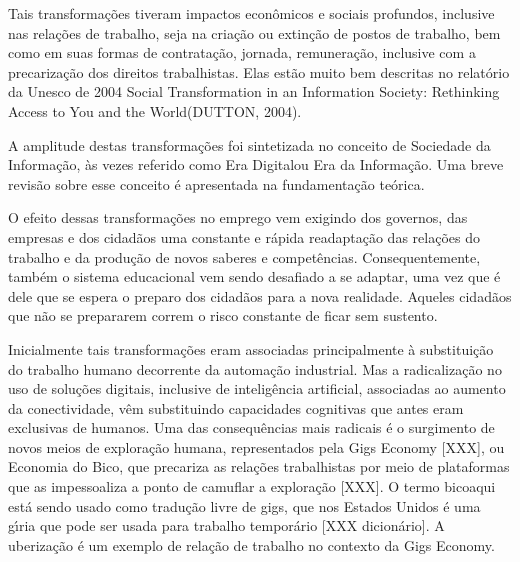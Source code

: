 \documentclass[
12pt,		%
openright,	%
twoside,  %
a4paper,			%
chapter=TITLE,		%
english,			%
french,				%
spanish,			%
brazil				%
]{USPSC-classe/USPSC}
\begin{document}
Tais transforma\c{c}\~oes tiveram impactos econ\^omicos e sociais profundos, inclusive nas rela\c{c}\~oes de trabalho, seja na cria\c{c}\~ao ou extin\c{c}\~ao de postos de trabalho, bem como em suas formas de contrata\c{c}\~ao, jornada, remunera\c{c}\~ao, inclusive com a precariza\c{c}\~ao dos direitos trabalhistas. Elas est\~ao muito bem descritas  no relat\'orio da Unesco  de 2004 \textquotedbl Social Transformation in an Information Society: Rethinking Access to You and the World\textquotedbl  (DUTTON, 2004).










A amplitude destas transforma\c{c}\~oes foi sintetizada no conceito de \textquotedbl Sociedade da Informa\c{c}\~ao\textquotedbl , \`as vezes referido como \textquotedbl Era Digital\textquotedbl  ou \textquotedbl Era da Informa\c{c}\~ao\textquotedbl . Uma breve revis\~ao sobre esse conceito \'e apresentada na fundamenta\c{c}\~ao te\'orica.










O efeito dessas transforma\c{c}\~oes no emprego vem exigindo dos governos, das empresas e dos cidad\~aos uma constante e r\'apida readapta\c{c}\~ao  das rela\c{c}\~oes do trabalho e da produ\c{c}\~ao de novos saberes e compet\^encias. Consequentemente, tamb\'em o sistema educacional vem sendo desafiado a se adaptar, uma vez que \'e dele que se espera o preparo dos cidad\~aos para a nova realidade. Aqueles cidad\~aos que n\~ao se prepararem correm o risco constante de ficar sem sustento.










Inicialmente tais transforma\c{c}\~oes eram associadas principalmente \`a substitui\c{c}\~ao do trabalho humano decorrente da automa\c{c}\~ao industrial. Mas a radicaliza\c{c}\~ao no uso de solu\c{c}\~oes digitais, inclusive de intelig\^encia artificial, associadas ao aumento da conectividade, v\^em substituindo capacidades \textquotedbl cognitivas que antes eram exclusivas de humanos\textquotedbl [4 XXX]. Uma das consequ\^encias mais radicais \'e o surgimento de novos meios de explora\c{c}\~ao humana, representados pela \textquotedbl Gigs Economy [XXX], ou \textquotedbl Economia do Bico\textquotedbl , que precariza as rela\c{c}\~oes trabalhistas por meio de plataformas que as impessoaliza a ponto de camuflar a explora\c{c}\~ao [XXX]. O termo \textquotedbl bico\textquotedbl  aqui est\'a sendo usado como tradu\c{c}\~ao livre de \textquotedbl gigs\textquotedbl , que nos Estados Unidos \'e uma g\'{\i}ria que pode ser usada para trabalho tempor\'ario [XXX dicion\'ario]. A uberiza\c{c}\~ao \'e um exemplo de rela\c{c}\~ao de trabalho no contexto da Gigs Economy.
\end{document}
